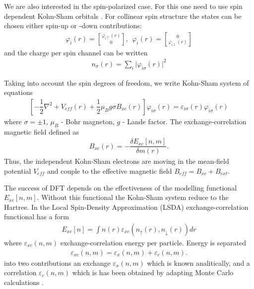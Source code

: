 We are also interested in the spin-polarized case.
For this one need to use spin dependent Kohn-Sham orbitals \citep{d708ea4e-b296-4065-a471-c6f480e1d50e,PANT19721157}. For collinear spin structure the states can be chosen either spin-up or -down contributions:
\begin{align}
\varphi_i(r)={\varphi_{i \uparrow }(r) \brack 0}, \: \: \varphi_i(r)={0 \brack \varphi_{i \downarrow }(r)}
\label{KS_spinors}
\end{align}
and the charge per spin channel can be written
\begin{align}
n_\sigma(r)=\sum_i \vert \varphi_{i \sigma}(r) \vert^2
\label{KS_spinors}
\end{align}

Taking into account the spin degrees of freedom, we write Kohn-Sham system of equations 
\begin{align}
\left[ -\dfrac{1}{2} \nabla^2 + V_{eff}(r) + \dfrac{1}{2} \mu_B g \sigma B_{xc}(r) \right] \varphi_{i\sigma }(r)=\varepsilon_{i\sigma}(r) \varphi_{i\sigma }(r)
\label{KS}
\end{align}
where $\sigma = \pm 1$, $\mu_B$ - Bohr magneton, $g$ - Lande factor. 
The exchange-correlation magnetic field \citep{Niesert:15621,Gorni_Tommaso_PhD} defined as
\begin{align}
B_{xc}(r)=-\dfrac{\delta E_{xc}[n,m]}{\delta m(r)}.
\label{mag_fi}
\end{align}
Thus, the independent Kohn-Sham electrons are moving in the mean-field potential $V_{eff}$ and couple to the effective magnetic field $B_{eff} = B_{xc} + B_{ext}$.

The success of DFT depends on the effectiveness of the modelling functional $E_{xc}[n,m]$. Without this functional the Kohn-Sham system reduce to the Hartree. In the Local Spin-Density Approximation (LSDA) exchange-correlation functional has a form
\begin{align}
E_{xc}[n]=\int n(r) \varepsilon_{xc}(n_\uparrow(r),n_\downarrow(r)) dr
\label{LSDA_1}
\end{align}
where $\varepsilon_{xc}(n,m)$ exchange-correlation energy per particle.
Energy is separated 
\begin{align}
\varepsilon_{xc}(n,m)=\varepsilon_x(n,m)+\varepsilon_c(n,m).
\label{LSDA_2}
\end{align}
into two contributions an exchange $\varepsilon_{x}(n,m)$ which is known analitically, and a correlation $\varepsilon_{c}(n,m)$ which is has been obtained by adapting Monte Carlo calculations \citep{PhysRevLett.45.566,doi:10.1139/p80-159}.



